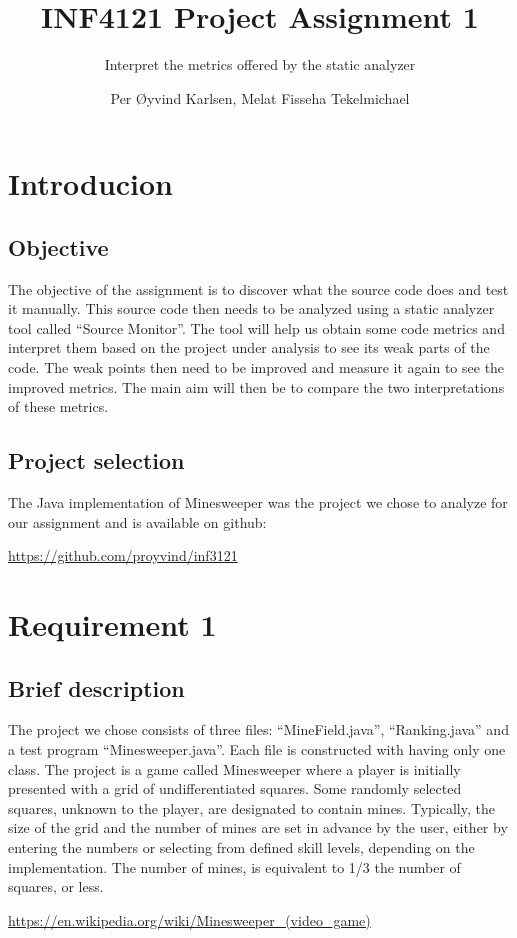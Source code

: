 \documentclass[UKenglish]{article}  %
\title{INF4121 Project Assignment 1}
\subtitle{Interpret the metrics offered by the static analyzer}
\author{Per Øyvind Karlsen, Melat Fisseha Tekelmichael}
\begin{document}
\ififorside

\section{Introducion}

\subsection{Objective}
The objective of the assignment is to discover what the source code does and
test it manually. This source code then needs to be analyzed using a static
analyzer tool called “Source Monitor”. The tool will help us obtain some
code metrics and interpret them based on the project under analysis to see its
weak parts of the code. The weak points then need to be improved and measure
it again to see the improved metrics.
The main aim will then be to compare the two interpretations of these metrics. 

\subsection{Project selection}
The Java implementation of Minesweeper was the project we chose to analyze for
our assignment and is available on github:

\url{https://github.com/proyvind/inf3121}

\section{Requirement 1}

\subsection{Brief description}
The project we chose consists of three files: “MineField.java”,
“Ranking.java” and a test program  “Minesweeper.java”.
Each file is constructed with having only one class.
The project is a game called Minesweeper where a player is initially presented
with a grid of undifferentiated squares. Some randomly selected squares,
unknown to the player, are designated to contain mines.
Typically, the size of the grid and the number of mines are set in advance by
the user, either by entering the numbers or selecting from defined skill
levels, depending on the implementation. The number of mines, is equivalent to
1/3 the number of squares, or less.

\url{https://en.wikipedia.org/wiki/Minesweeper_(video_game)}
\end{document}
